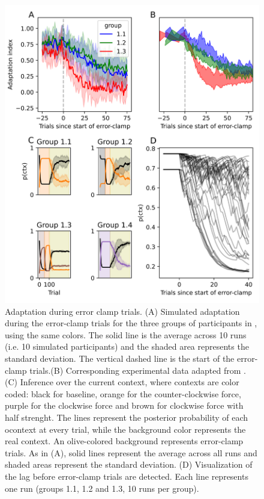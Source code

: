 \documentclass[a4paper,doc,floatsintext,natbib]{apa6}
\begin{document}
\begin{figure}
\centering
\includegraphics[width=\textwidth]{./figures/figure_4.png}
\caption{Adaptation during error clamp trials. (A) Simulated adaptation during the error-clamp trials for the three groups of participants in \cite{Vaswani_Decay_2013}, using the same colors. The solid line is the average across 10 runs (i.e. 10 simulated participants) and the shaded area represents the standard deviation. The vertical dashed line is the start of the error-clamp trials.(B) Corresponding experimental data adapted from \cite{Vaswani_Decay_2013}. (C) Inference over the current context, where contexts are color coded: black for baseline, orange for the counter-clockwise force, purple for the clockwise force and brown for clockwise force with half strenght. The lines represent the posterior probability of each ocontext at every trial, while the background color represents the real context. An olive-colored background represents error-clamp trials. As in (A), solid lines represent the average across all runs and shaded areas represent the standard deviation. (D) Visualization of the lag before error-clamp trials are detected. Each line represents one run (groups 1.1, 1.2 and 1.3, 10 runs per group).}
\label{fig:vaswani-2013}
\end{figure}
\end{document}
